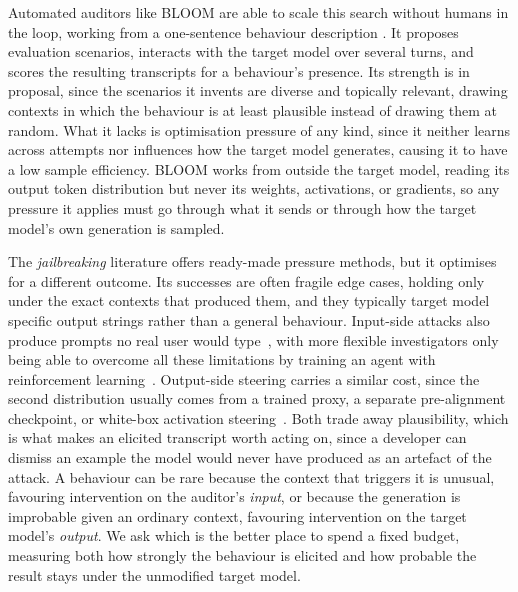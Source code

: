 \documentclass{article}
\theoremstyle{plain}
\theoremstyle{definition}
\theoremstyle{remark}
\begin{document}
Automated auditors like BLOOM are able to scale this search without humans in the loop, working from a one-sentence behaviour description \citep{gupta2025bloom}.
It proposes evaluation scenarios, interacts with the target model over several turns, and scores the resulting transcripts for a behaviour's presence.
Its strength is in proposal, since the scenarios it invents are diverse and topically relevant, drawing contexts in which the behaviour is at least plausible instead of drawing them at random.
What it lacks is optimisation pressure of any kind, since it neither learns across attempts nor influences how the target model generates, causing it to have a low sample efficiency.
BLOOM works from outside the target model, reading its output token distribution but never its weights, activations, or gradients, so any pressure it applies must go through what it sends or through how the target model's own generation is sampled.

The \emph{jailbreaking} literature offers ready-made pressure methods, but it optimises for a different outcome.
Its successes are often fragile edge cases, holding only under the exact contexts that produced them, and they typically target model specific output strings rather than a general behaviour.
Input-side attacks also produce prompts no real user would type~\citep{zou2023universal,sadasivan2024fast}, with more flexible investigators only being able to overcome all these limitations by training an agent with reinforcement learning~\citep{chowdhury2025pathological}.
Output-side steering carries a similar cost, since the second distribution usually comes from a trained proxy, a separate pre-alignment checkpoint, or white-box activation steering~\citep{zhao2024weak,liu2024proxy,zhou2024emulated,angell2026tail}.
Both trade away plausibility, which is what makes an elicited transcript worth acting on, since a developer can dismiss an example the model would never have produced as an artefact of the attack.
A behaviour can be rare because the context that triggers it is unusual, favouring intervention on the auditor's \emph{input}, or because the generation is improbable given an ordinary context, favouring intervention on the target model's \emph{output}.
We ask which is the better place to spend a fixed budget, measuring both how strongly the behaviour is elicited and how probable the result stays under the unmodified target model.
\end{document}
